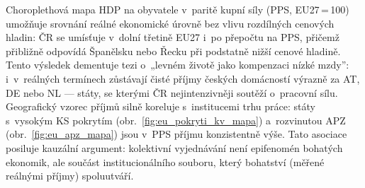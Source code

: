 Choroplethová mapa \ac{HDP} na obyvatele v~paritě kupní síly (\ac{PPS}, \ac{EU}27\,=\,100) umožňuje srovnání reálné ekonomické úrovně bez vlivu rozdílných cenových hladin: ČR se umísťuje v~dolní třetině EU27 i~po přepočtu na \ac{PPS}, přičemž přibližně odpovídá Španělsku nebo Řecku při podstatně nižší cenové hladině.
Tento výsledek dementuje tezi o~„levném životě jako kompenzaci nízké mzdy”: i~v~reálných termínech zůstávají čisté příjmy českých domácností výrazně za AT, DE nebo NL --- státy, se kterými ČR nejintenzivněji soutěží o~pracovní sílu.
Geografický vzorec příjmů silně koreluje s~institucemi trhu práce: státy s~vysokým \ac{KS} pokrytím (obr.~\ref{fig:eu_pokryti_kv_mapa}) a~rozvinutou \ac{APZ} (obr.~\ref{fig:eu_apz_mapa}) jsou v~\ac{PPS} příjmu konzistentně výše.
Tato asociace posiluje kauzální argument: kolektivní vyjednávání není epifenomén bohatých ekonomik, ale součást institucionálního souboru, který bohatství (měřené reálnými příjmy) spoluutváří.


